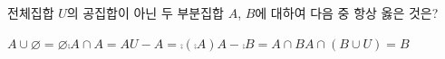 전체집합 $U$의 공집합이 아닌 두 부분집합 $A$, $B$에 대하여 다음 중 항상 옳은 것은?
\begin{choicesii}{$A\cup\varnothing=\varnothing$}{$\comp{A}\cap A=A$}{$U-A=\comp{(\comp{A})}$}{$A-\comp{B}=A\cap B$}{$A\cap(B\cup U)=B$}\end{choicesii}
